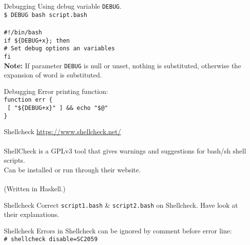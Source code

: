 \documentclass{beamer}
\let\tt\texttt
\let\bf\textbf
\begin{document}
\begin{frame}{Debugging}
    Using debug variable \tt{DEBUG}.    \\
    \tt{\$ DEBUG bash script.bash}      \\
    \quad   \\
    \tt{\#!/bin/bash}                   \\
    \tt{if \$\{DEBUG+x\}; then}         \\
    \quad \tt{\# Set debug options an variables}  \\
    \tt{fi}                             \\
    \bf{Note:} If parameter \tt{DEBUG} is null or unset, nothing is substituted, otherwise the expansion of word is substituted.   \\
\end{frame}

\begin{frame}{Debugging}
    Error printing function:                       \\
    \tt{function err \{ }                          \\
    \quad \tt{ [ "\$\{DEBUG+x\}" ] \&\& echo "\$@"}  \\
    \tt{\}}
\end{frame}

\begin{frame}{Shellcheck}
    \url{https://www.shellcheck.net/}               \\
    \quad       \\
    ShellCheck is a GPLv3 tool that gives warnings and suggestions for bash/sh shell scripts.   \\
    Can be installed or run through their website.      \\
    \quad   \\
    (Written in Haskell.)
\end{frame}

\begin{frame}{Shellcheck}
    Correct \tt{script1.bash} \& \tt{script2.bash} on Shellcheck. Have look at their explanations.
\end{frame}

\begin{frame}{Shellcheck}
    Errors in Shellcheck can be ignored by comment before error line:    \\
    \tt{\# shellcheck disable=SC2059}
\end{frame}
\end{document}
